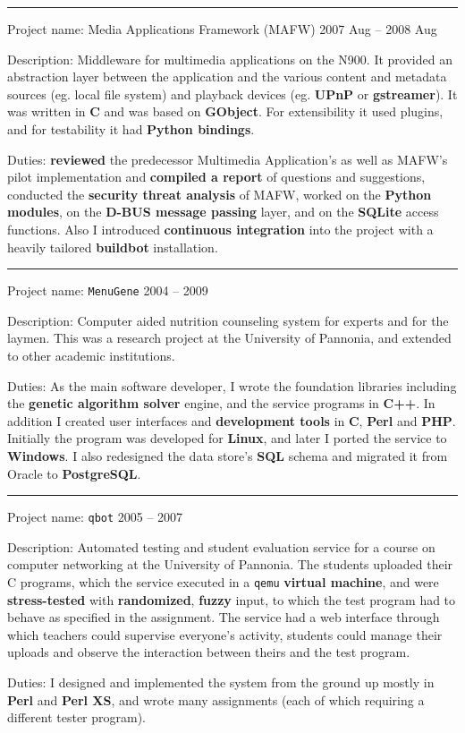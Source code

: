 \documentclass[a4paper,12pt]{article}
\newcommand\Yell{\textbf}
\newcommand\Label{\textsf}
\newcommand{\midline}{\rule[0.5ex]{\linewidth-\parindent}{.5pt}}
\begin{document}
\midline\par
\Label{Project name}: Media Applications Framework (MAFW)\hfill
\Label{2007 Aug -- 2008 Aug}\par
\Label{Description}: Middleware for multimedia applications on the N900.
It provided an abstraction layer between the application and the various
content and metadata sources (eg. local file system) and playback devices
(eg. \Yell{UPnP} or \Yell{gstreamer}).  It was written in \Yell{C} and was
based on \Yell{GObject}.  For extensibility it used plugins, and for
testability it had \Yell{Python bindings}.\par
\Label{Duties}: \Yell{reviewed} the predecessor Multimedia Application's
as well as MAFW's pilot implementation and \Yell{compiled a report} of
questions and suggestions, conducted the \Yell{security threat analysis}
of MAFW, worked on the \Yell{Python modules}, on the \Yell{D-BUS message
passing} layer, and on the \Yell{SQLite} access functions.  Also I introduced
\Yell{continuous integration} into the project with a heavily tailored
\Yell{buildbot} installation.

\midline\par
\Label{Project name}: \texttt{MenuGene}\hfill
\Label{2004 -- 2009}\par
\Label{Description}: Computer aided nutrition counseling system for
experts and for the laymen.  This was a research project at the University
of Pannonia, and extended to other academic institutions.\par
\Label{Duties}: As the main software developer, I wrote the foundation
libraries including the \Yell{genetic algorithm solver} engine, and the
service programs in \Yell{C++}.  In addition I created user interfaces
and \Yell{development tools} in \Yell{C}, \Yell{Perl} and \Yell{PHP}.
Initially the program was developed for \Yell{Linux}, and later I ported
the service to \Yell{Windows}.  I also redesigned the data store's \Yell{SQL}
schema and migrated it from Oracle to \Yell{PostgreSQL}.

\midline\par
\Label{Project name}: \texttt{qbot}\hfill
\Label{2005 -- 2007}\par
\Label{Description}: Automated testing and student evaluation service for a
course on computer networking at the University of Pannonia.  The students
uploaded their C programs, which the service executed in a \texttt{qemu}
\Yell{virtual machine}, and were \Yell{stress-tested} with \Yell{randomized},
\Yell{fuzzy} input, to which the test program had to behave as specified in
the assignment.  The service had a web interface through which teachers could
supervise everyone's activity, students could manage their uploads and observe
the interaction between theirs and the test program.\par
\Label{Duties}: I designed and implemented the system from the ground up mostly
in \Yell{Perl} and \Yell{Perl XS}, and wrote many assignments (each of which
requiring a different tester program).
\end{document}
